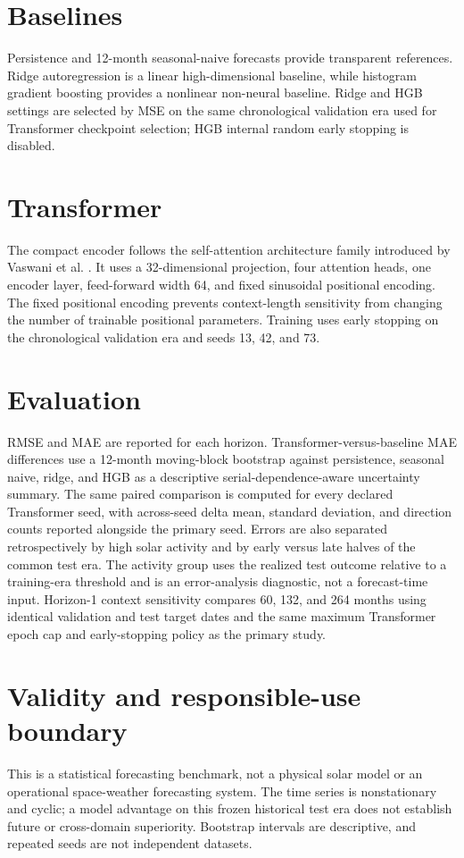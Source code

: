 \documentclass[11pt]{article}
\begin{document}
\section{Baselines}
Persistence and 12-month seasonal-naive forecasts provide transparent references. Ridge autoregression is a linear high-dimensional baseline, while histogram gradient boosting provides a nonlinear non-neural baseline. Ridge and HGB settings are selected by MSE on the same chronological validation era used for Transformer checkpoint selection; HGB internal random early stopping is disabled.

\section{Transformer}
The compact encoder follows the self-attention architecture family introduced by Vaswani et al. \cite{vaswani2017attention}. It uses a 32-dimensional projection, four attention heads, one encoder layer, feed-forward width 64, and fixed sinusoidal positional encoding. The fixed positional encoding prevents context-length sensitivity from changing the number of trainable positional parameters. Training uses early stopping on the chronological validation era and seeds 13, 42, and 73.

\section{Evaluation}
RMSE and MAE are reported for each horizon. Transformer-versus-baseline MAE differences use a 12-month moving-block bootstrap against persistence, seasonal naive, ridge, and HGB as a descriptive serial-dependence-aware uncertainty summary. The same paired comparison is computed for every declared Transformer seed, with across-seed delta mean, standard deviation, and direction counts reported alongside the primary seed. Errors are also separated retrospectively by high solar activity and by early versus late halves of the common test era. The activity group uses the realized test outcome relative to a training-era threshold and is an error-analysis diagnostic, not a forecast-time input. Horizon-1 context sensitivity compares 60, 132, and 264 months using identical validation and test target dates and the same maximum Transformer epoch cap and early-stopping policy as the primary study.



\section{Validity and responsible-use boundary}
This is a statistical forecasting benchmark, not a physical solar model or an operational space-weather forecasting system. The time series is nonstationary and cyclic; a model advantage on this frozen historical test era does not establish future or cross-domain superiority. Bootstrap intervals are descriptive, and repeated seeds are not independent datasets.
\end{document}
